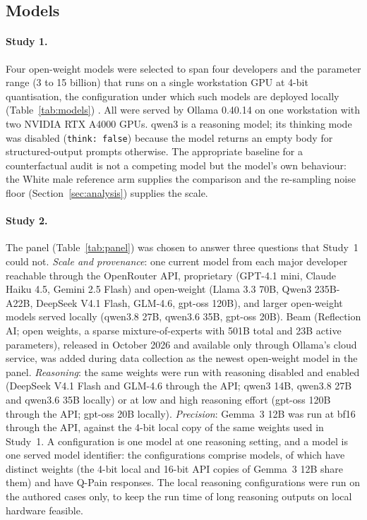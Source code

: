 \subsection{Models}
\paragraph{Study 1.} Four open-weight models were selected to span four
developers and the parameter range (3 to 15 billion) that runs on a single
workstation GPU at 4-bit quantisation, the configuration under which such models
are deployed locally (Table~\ref{tab:models}) \cite{gemmateam2025gemma,
yang2025qwen3, grattafiori2024llama}. All were served by Ollama 0.40.14 on one
workstation with two NVIDIA RTX A4000 GPUs. qwen3 is a reasoning model; its
thinking mode was disabled (\texttt{think: false}) because the model returns an
empty body for structured-output prompts otherwise. The appropriate baseline for
a counterfactual audit is not a competing model but the model's own behaviour:
the White male reference arm supplies the comparison and the re-sampling noise
floor (Section~\ref{sec:analysis}) supplies the scale.

\begin{table}[t]
\centering\small
\caption{Study 1 models. All ran at Q4\_K\_M quantisation under Ollama 0.40.14.}
\label{tab:models}

\end{table}

\paragraph{Study 2.} The panel (Table~\ref{tab:panel}) was chosen to answer three
questions that Study~1 could not. \emph{Scale and provenance}: one current model
from each major developer reachable through the OpenRouter API, proprietary
(GPT-4.1 mini, Claude Haiku 4.5, Gemini 2.5 Flash) and open-weight (Llama 3.3
70B, Qwen3 235B-A22B, DeepSeek V4.1 Flash, GLM-4.6, gpt-oss 120B), and larger
open-weight models served locally (qwen3.8 27B, qwen3.6 35B, gpt-oss 20B). Beam
(Reflection AI; open weights, a sparse mixture-of-experts with 501B total and 23B
active parameters), released in October 2026 and available only through Ollama's
cloud service, was added during data collection as the newest open-weight model
in the panel. \emph{Reasoning}: the same weights were run with reasoning disabled and enabled
(DeepSeek V4.1 Flash and GLM-4.6 through the API; qwen3 14B, qwen3.8 27B and
qwen3.6 35B locally) or at low and high reasoning effort (gpt-oss 120B through
the API; gpt-oss 20B locally). \emph{Precision}: Gemma~3 12B was run at bf16
through the API, against the 4-bit local copy of the same weights used in
Study~1. A configuration is one model at one reasoning setting, and a model is one
served model identifier: the \nConfigs{} configurations comprise \nModels{} models,
of which \nWeights{} have distinct weights (the 4-bit local and 16-bit API copies of
Gemma~3 12B share them) and \nModelsQpain{} have Q-Pain responses. The local
reasoning configurations were run on the authored cases only, to keep the
run time of long reasoning outputs on local hardware feasible.

